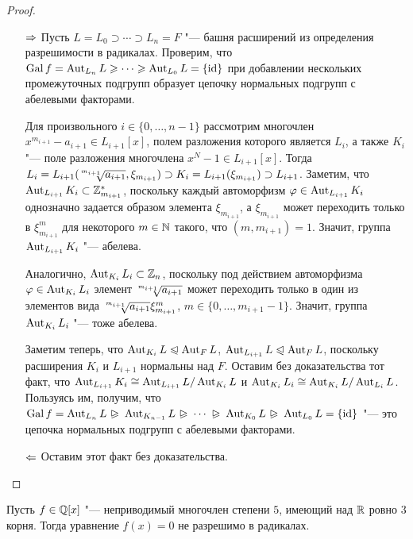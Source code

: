 \begin{proof}~
	\begin{itemize}
		\item[$\Rightarrow$] Пусть $L = L_0 \supset \dotsb \supset L_n = F$ "--- башня расширений из определения разрешимости в радикалах. Проверим, что $\operatorname{Gal}{f} = \operatorname{Aut}_{L_n}{L} \geqslant \dotsb \geqslant \operatorname{Aut}_{L_0}L = \{\operatorname{id}\}$ при добавлении нескольких промежуточных подгрупп образует цепочку нормальных подгрупп с абелевыми факторами.
		
		Для произвольного $i \in \{0, \dotsc, n - 1\}$ рассмотрим многочлен $x^{m_{i+1}} - a_{i+1} \in L_{i + 1}[x]$, полем разложения которого является $L_i$, а также $K_i$ "--- поле разложения многочлена $x^N - 1 \in L_{i + 1}[x]$. Тогда $L_i = L_{i + 1}(\sqrt[\leftroot{2}\uproot{4}m_{i+1}]{a_{i+1}}, \xi_{m_{i+1}}) \supset K_i = L_{i + 1}(\xi_{m_{i+1}}) \supset L_{i + 1}$. Заметим, что $\operatorname{Aut}_{L_{i+1}}K_i \subset \mathbb{Z}_{m_{i+1}}^*$, поскольку каждый автоморфизм $\varphi \in \operatorname{Aut}_{L_{i+1}}K_i$ однозначно задается образом элемента $\xi_{m_{i+1}}$, а $\xi_{m_{i+1}}$ может переходить только в $\xi_{m_{i+1}}^m$ для некоторого $m \in \mathbb{N}$ такого, что $(m, {m_{i+1}}) = 1$. Значит, группа $\operatorname{Aut}_{L_{i+1}}K_i$ "--- абелева.
		
		Аналогично, $\operatorname{Aut}_{K_i}L_i \subset \mathbb{Z}_n$, поскольку под действием автоморфизма $\varphi \in \operatorname{Aut}_{K_i}L_i$ элемент $\sqrt[\leftroot{2}\uproot{4}m_{i+1}]{a_{i+1}}$ может переходить только в один из элементов вида $\sqrt[\leftroot{2}\uproot{4}m_{i+1}]{a_{i+1}}\xi_{m_{i+1}}^m$, $m \in \{0, \dotsc, m_{i+1} - 1\}$. Значит, группа $\operatorname{Aut}_{K_i}L_i$ "--- тоже абелева.
		
		Заметим теперь, что $\operatorname{Aut}_{K_i}L \trianglelefteqslant \operatorname{Aut}_FL$, $\operatorname{Aut}_{L_{i + 1}}L \trianglelefteqslant \operatorname{Aut}_FL$, поскольку расширения $K_i$ и $L_{i + 1}$ нормальны над $F$. Оставим без доказательства тот факт, что $\Aut_{L_{i+1}}K_i \hm\cong \Aut_{L_{i + 1}}L / \Aut_{K_i}L$ и $\operatorname{Aut}_{K_i}L_i \cong \operatorname{Aut}_{K_i}L / \operatorname{Aut}_{L_i}L$. Пользуясь им, получим, что $\Gal{f} = \Aut_{L_n}{L} \varnormal \Aut_{K_{n-1}}L \varnormal \dotsb \varnormal \Aut_{K_0}L \varnormal \Aut_{L_0}L = \{\id\}$ "--- это цепочка нормальных подгрупп с абелевыми факторами.
		
		\item[$\Leftarrow$] Оставим этот факт без доказательства.\qedhere
	\end{itemize}
\end{proof}

\begin{corollary}
	Пусть $f \in \mathbb{Q}[x]$ "--- неприводимый многочлен степени $5$, имеющий над $\mathbb{R}$ ровно $3$ корня. Тогда уравнение $f(x) = 0$ не разрешимо в радикалах.
\end{corollary}


